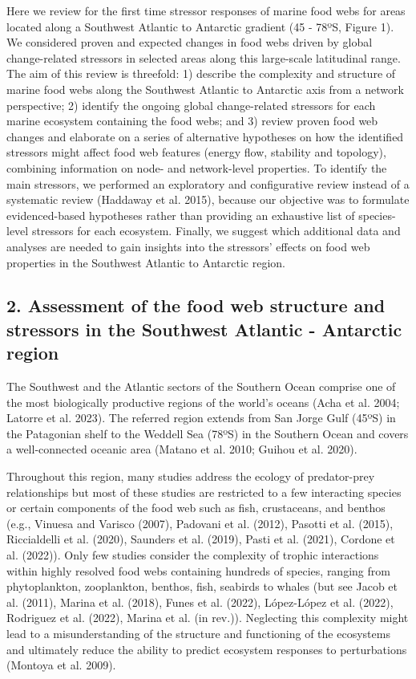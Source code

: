 \documentclass[
]{article}
\begin{document}
Here we review for the first time stressor responses of marine food webs
for areas located along a Southwest Atlantic to Antarctic gradient (45 -
78ºS, Figure 1). We considered proven and expected changes in food webs
driven by global change-related stressors in selected areas along this
large-scale latitudinal range. The aim of this review is threefold: 1)
describe the complexity and structure of marine food webs along the
Southwest Atlantic to Antarctic axis from a network perspective; 2)
identify the ongoing global change-related stressors for each marine
ecosystem containing the food webs; and 3) review proven food web
changes and elaborate on a series of alternative hypotheses on how the
identified stressors might affect food web features (energy flow,
stability and topology), combining information on node- and
network-level properties. To identify the main stressors, we performed
an exploratory and configurative review instead of a systematic review
(Haddaway et al. 2015), because our objective was to formulate
evidenced-based hypotheses rather than providing an exhaustive list of
species-level stressors for each ecosystem. Finally, we suggest which
additional data and analyses are needed to gain insights into the
stressors' effects on food web properties in the Southwest Atlantic to
Antarctic region.

\subsection{2. Assessment of the food web structure and stressors in the
Southwest Atlantic - Antarctic
region}\label{assessment-of-the-food-web-structure-and-stressors-in-the-southwest-atlantic---antarctic-region}

The Southwest and the Atlantic sectors of the Southern Ocean comprise
one of the most biologically productive regions of the world's oceans
(Acha et al. 2004; Latorre et al. 2023). The referred region extends
from San Jorge Gulf (45ºS) in the Patagonian shelf to the Weddell Sea
(78ºS) in the Southern Ocean and covers a well-connected oceanic area
(Matano et al. 2010; Guihou et al. 2020).

Throughout this region, many studies address the ecology of
predator-prey relationships but most of these studies are restricted to
a few interacting species or certain components of the food web such as
fish, crustaceans, and benthos (e.g., Vinuesa and Varisco (2007),
Padovani et al. (2012), Pasotti et al. (2015), Riccialdelli et al.
(2020), Saunders et al. (2019), Pasti et al. (2021), Cordone et al.
(2022)). Only few studies consider the complexity of trophic
interactions within highly resolved food webs containing hundreds of
species, ranging from phytoplankton, zooplankton, benthos, fish,
seabirds to whales (but see Jacob et al. (2011), Marina et al. (2018),
Funes et al. (2022), López-López et al. (2022), Rodriguez et al. (2022),
Marina et al. (in rev.)). Neglecting this complexity might lead to a
misunderstanding of the structure and functioning of the ecosystems and
ultimately reduce the ability to predict ecosystem responses to
perturbations (Montoya et al. 2009).
\end{document}
